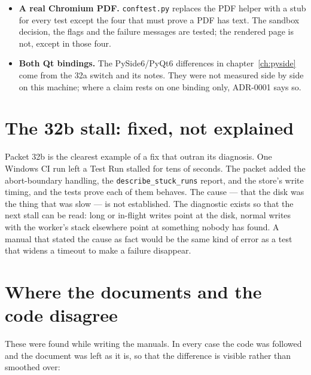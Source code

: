 \begin{itemize}
    disk. The first attempt, using the machine's \texttt{/tmp}, failed with \texttt{[Errno 28] No space left
    on device}. \texttt{tests/\allowbreak{}test\_\allowbreak{}release\_\allowbreak{}ci\_\allowbreak{}28c.py} also asserts the gate is written as documented and
    the smoke scripts' logic. Nothing outside \texttt{debian:stable} has been smoked: no Fedora, no
    Ubuntu release, no container on a machine with SELinux enforced.
  \item \textbf{A real Chromium PDF.} \texttt{conftest.py} replaces the PDF helper with a stub for
    every test except the four that must prove a PDF has text. The sandbox decision, the flags and
    the failure messages are tested; the rendered page is not, except in those four.
  \item \textbf{Both Qt bindings.} The PySide6/PyQt6 differences in chapter~\ref{ch:pyside} come
    from the 32a switch and its notes. They were not measured side by side on this machine; where a
    claim rests on one binding only, ADR-0001 says so.
\end{itemize}

\section{The 32b stall: fixed, not explained}

Packet 32b is the clearest example of a fix that outran its diagnosis. One Windows CI run left a
Test Run stalled for tens of seconds. The packet added the abort-boundary handling, the
\texttt{describe\_\allowbreak{}stuck\_\allowbreak{}runs} report, and the store's write timing, and the tests prove each of
them behaves. The cause --- that the disk was the thing that was slow --- is not established. The
diagnostic exists so that the next stall can be read: long or in-flight writes point at the disk,
normal writes with the worker's stack elsewhere point at something nobody has found. A manual that
stated the cause as fact would be the same kind of error as a test that widens a timeout to make a
failure disappear.

\section{Where the documents and the code disagree}

These were found while writing the manuals. In every case the code was followed and the document was
left as it is, so that the difference is visible rather than smoothed over:

